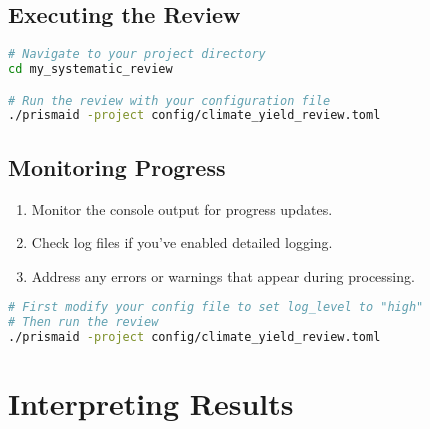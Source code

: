 
\subsection{Executing the Review}

\begin{commandbox}
\begin{lstlisting}[language=Bash]
# Navigate to your project directory
cd my_systematic_review

# Run the review with your configuration file
./prismaid -project config/climate_yield_review.toml
\end{lstlisting}
\end{commandbox}


\subsection{Monitoring Progress}

\begin{enumerate}
    \item Monitor the console output for progress updates.
    \item Check log files if you've enabled detailed logging.
    \item Address any errors or warnings that appear during processing.
\end{enumerate}

\begin{commandbox}
\begin{lstlisting}[language=Bash]
# First modify your config file to set log_level to "high"
# Then run the review
./prismaid -project config/climate_yield_review.toml
\end{lstlisting}
\end{commandbox}


\section{Interpreting Results}

